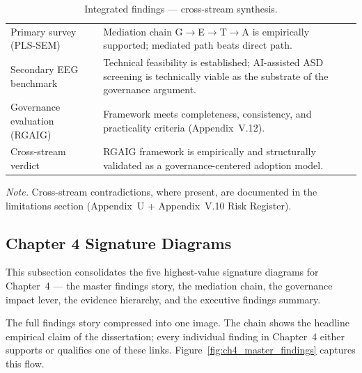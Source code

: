 {\tablestripes\tablefontsize
{}
\begin{xltabular}{\textwidth}{@{} >{\raggedright\arraybackslash}p{5cm} L @{}}
\caption[Integrated findings --- cross-stream synthesis]{Integrated findings --- cross-stream synthesis.}\label{tab:ch4_integrated_findings} \\
\toprule
{} &  \\
\midrule
\endfirsthead
\endhead
\bottomrule
\endlastfoot
Primary survey (PLS-SEM) & Mediation chain G$\rightarrow$E$\rightarrow$T$\rightarrow$A is empirically supported; mediated path beats direct path. \\
\addlinespace
Secondary EEG benchmark & Technical feasibility is established; AI-assisted ASD screening is technically viable as the substrate of the governance argument. \\
\addlinespace
Governance evaluation (RGAIG) & Framework meets completeness, consistency, and practicality criteria (Appendix~V.12). \\
\addlinespace
Cross-stream verdict & RGAIG framework is empirically and structurally validated as a governance-centered adoption model. \\
\end{xltabular}}

\vspace{0.3em}\noindent\textit{Note.} Cross-stream contradictions, where present, are documented in the limitations section (Appendix~U + Appendix~V.10 Risk Register).



\subsection{Chapter 4 Signature Diagrams}
\label{sec:ch4_signature_diagrams}

\noindent This subsection consolidates the five highest-value signature diagrams for Chapter~4 --- the master findings story, the mediation chain, the governance impact lever, the evidence hierarchy, and the executive findings summary.


\noindent The full findings story compressed into one image. The chain shows the headline empirical claim of the dissertation; every individual finding in Chapter~4 either supports or qualifies one of these links. Figure~\ref{fig:ch4_master_findings} captures this flow.

